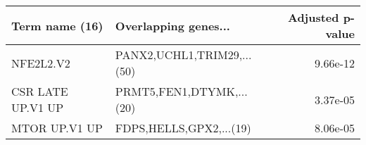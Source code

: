 \begin{tabular}{llr}
\toprule
   Term name (16) &       Overlapping genes... &  Adjusted p-value \\
\midrule
        NFE2L2.V2 & PANX2,UCHL1,TRIM29,...(50) &          9.66e-12 \\
CSR LATE UP.V1 UP &   PRMT5,FEN1,DTYMK,...(20) &          3.37e-05 \\
    MTOR UP.V1 UP &    FDPS,HELLS,GPX2,...(19) &          8.06e-05 \\
\bottomrule
\end{tabular}

